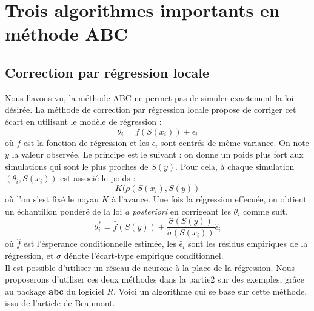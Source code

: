 \documentclass{article}
\theoremstyle{definition}
\begin{document}
\section{Trois algorithmes importants en méthode ABC}

\subsection{Correction par régression locale}
 Nous l'avons vu, la méthode ABC ne permet pas de simuler exactement la loi désirée. La méthode de correction par régression locale propose de corriger cet écart en utilisant le modèle de régression :
\[\theta_i=f(S(x_i))+\epsilon_i\]
où $f$ est la fonction de régression et les $\epsilon_i$ sont centrés de même variance. On note $y$ la valeur observée. Le principe est le suivant : on donne un poids plus fort aux simulations qui sont le plus proches de $S(y)$. Pour cela, à chaque simulation $(\theta_i,S(x_i))$ est associé le poids :
\[K(\rho(S(x_i),S(y))\] 
où l'on s'est fixé le noyau $K$ à l'avance. Une fois la régression effecuée, on obtient un échantillon pondéré de la loi \textit{a posteriori} en corrigeant les $\theta_i$ comme suit,
\[\theta^*_i=\hat f(S(y))+\frac{\hat\sigma(S(y))}{\hat\sigma(S(x_i))}\hat\epsilon_i\]
où $\hat f$ est l'ésperance conditionnelle estimée, les $\hat\epsilon_i$ sont les résidus empiriques de la régression, et $\hat\sigma$ dénote l'écart-type empirique conditionnel.\\

Il est possible d'utiliser un réseau de neurone à la place de la régression. Nous proposerons d'utiliser ces deux méthodes dans la partie$2$ sur des exemples, grâce au package \textbf{abc} du logiciel $R$. Voici un algorithme qui se base sur cette méthode, issu de l'article de Beaumont.
\\
\end{document}
